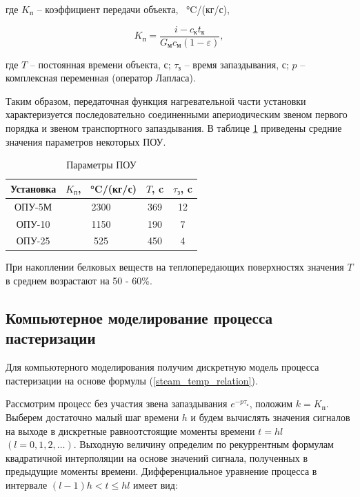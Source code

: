 где $K_\text{п}$ – коэффициент передачи объекта, \SI{}{\celsius}/(кг/с),

\begin{equation}
    K_\text{п} = \frac{i - c_\text{к} t_\text{к}}{G_\text{м} c_\text{м}(1 - \varepsilon)},
\end{equation}

где $T$ – постоянная времени объекта, с; $\tau_\text{з}$ – время запаздывания, с; $p$ – комплексная переменная (оператор Лапласа).

Таким образом, передаточная функция нагревательной части установки характеризуется последовательно соединенными апериодическим звеном первого порядка и звеном транспортного запаздывания. В таблице \ref{table:pasterizer_params} приведены средние значения параметров некоторых ПОУ.

\begin{table} [!h]
    \small
    \caption{Параметры ПОУ}\label{table:pasterizer_params}
    \centering
    \begin{tabular}{ | c | c | c | c | }
        \hline
        \textbf{Установка} & $K_\text{п}$, \SI{}{\celsius}/(кг/с) & $T$, c & $\tau_\text{з}$, c \\
        \hline
        ОПУ-5М             & 2300                                 & 369    & 12                 \\
        \hline
        ОПУ-10             & 1150                                 & 190    & 7                  \\
        \hline
        ОПУ-25             & 525                                  & 450    & 4                  \\
        \hline
    \end{tabular}
\end{table}

При накоплении белковых веществ на теплопередающих поверхностях значения $T$ в среднем возрастают на 50 - 60\%.

\subsection{Компьютерное моделирование процесса пастеризации}

Для компьютерного моделирования получим дискретную модель процесса пастеризации на основе формулы (\ref{steam_temp_relation}).

Рассмотрим процесс без участия звена запаздывания $e^{-p \tau_\text{з}}$, положим $k = K_\text{п}$. Выберем достаточно малый шаг времени $h$ и будем вычислять значения сигналов на выходе в дискретные равноотстоящие моменты времени $t = hl$ $(l = 0, 1, 2, \ldots)$. Выходную величину определим по рекуррентным формулам квадратичной интерполяции на основе значений сигнала, полученных в предыдущие моменты времени. Дифференциальное уравнение процесса в интервале $(l - 1)h < t \le hl$ имеет вид:

